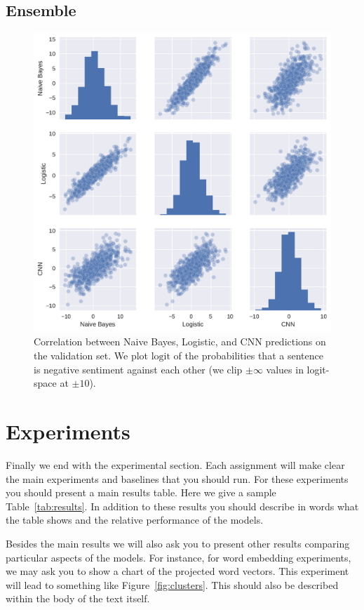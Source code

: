 \documentclass[11pt]{article}
\begin{document}
\subsection{Ensemble}
\label{sub:ensemble}


\begin{figure}[tb]
  \centering
  \includegraphics[width=\textwidth]{corrs.pdf}
  \caption{Correlation between Naive Bayes, Logistic, and CNN predictions on
  the validation set. We plot $\text{logit}$ of the probabilities that a
  sentence is negative sentiment against each other (we clip $\pm \infty$
  values in logit-space at $\pm 10$).}
  \label{fig:figure1}
\end{figure}

\section{Experiments}

Finally we end with the experimental section. Each assignment will make clear
the main experiments and baselines that you should run. For these experiments
you should present a main results table. Here we give a sample
Table~\ref{tab:results}. In addition to these results you should describe in
words what the table shows and the relative performance of the models.

Besides the main results we will also ask you to present other results
comparing particular aspects of the models. For instance, for word
embedding experiments, we may ask you to show a chart of the projected
word vectors. This experiment will lead to something like
Figure~\ref{fig:clusters}. This should also be described within the
body of the text itself.
\end{document}
